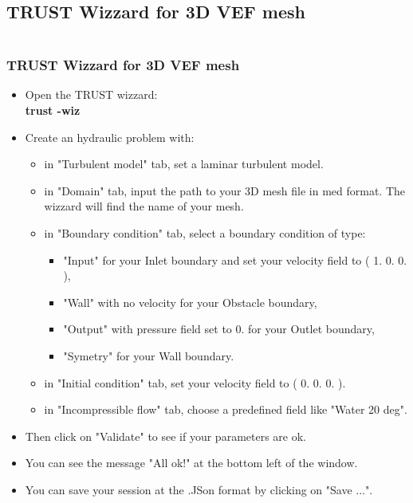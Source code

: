 \documentclass[10pt, hyperref={unicode=true,pdfusetitle, bookmarks=true,bookmarksnumbered=false,bookmarksopen=false, breaklinks=false,pdfborder={0 0 1},backref=true,colorlinks=true,linkcolor=darkblue,pageanchor}]{beamer}
\begin{document}
\subsection{TRUST Wizzard for 3D VEF mesh}
\begin{frame}
\begin{columns}[c] 
\tableofcontents[sections={1-9},currentsection, currentsubsection]
\tableofcontents[sections={10-16},currentsection, currentsubsection]
\end{columns}
\end{frame}
\begin{frame}
\frametitle{TRUST Wizzard for 3D VEF mesh}
\begin{block}{}

\begin{itemize}
\item Open the TRUST wizzard:\\
\textbf{trust -wiz}

\item Create an hydraulic problem with:
    \begin{itemize}
    \item in "Turbulent model" tab, set a laminar turbulent model.
    \item in "Domain" tab, input the path to your 3D mesh file in med format. The wizzard will find the name of your mesh.
    \item in "Boundary condition" tab, select a boundary condition of type:
        \begin{itemize}
        \item "Input" for your Inlet boundary and set your velocity field to ( 1. 0. 0. ),
        \item "Wall" with no velocity for your Obstacle boundary,
        \item "Output" with pressure field set to 0. for your Outlet boundary,
        \item "Symetry" for your Wall boundary.
        \end{itemize}
    \item in "Initial condition" tab, set your velocity field to ( 0. 0. 0. ).
    \item in "Incompressible flow" tab, choose a predefined field like "Water 20 deg".
    \end{itemize}
\item Then click on "Validate" to see if your parameters are ok.
\item You can see the message "All ok!" at the bottom left of the window.
\item You can save your session at the .JSon format by clicking on "Save ...".
\end{itemize}
\end{block}
\end{frame}
\end{document}
